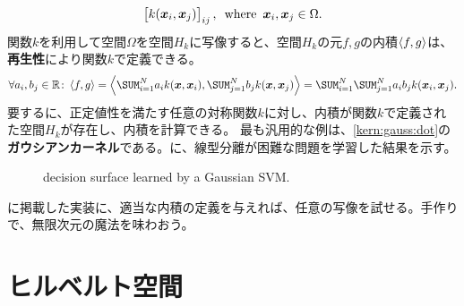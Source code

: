 \documentclass[10pt,a4paper]{book}
\begin{document}
%
\begin{equation}
\label{eq:kern:gram}
\begin{bmatrix}
k(\bm{x}_i,\bm{x}_j)
\end{bmatrix}_{ij},
\enspace\mathrm{where}\enspace
\bm{x}_i,\bm{x}_j \in \Omega.
\end{equation}
%
関数$k$を利用して空間$\Omega$を空間$H_k$に写像すると、空間$H_k$の元$f,g$の内積$\left\langle f,g\right\rangle$は、\textbf{再生性}により関数$k$で定義できる。
%
\begin{equation}
\forall a_i,b_j \in \mathbb{R} \colon
\iprod{f}{g} =
\iprod{\sum_{i=1}^N a_i k(\bm{x},\bm{x}_i)}{\sum_{j=1}^N b_j k(\bm{x},\bm{x}_j)} =
\sum_{i=1}^N \sum_{j=1}^N a_i b_j k(\bm{x}_i, \bm{x}_j).
\end{equation}
%
要するに、正定値性を満たす任意の対称関数$k$に対し、内積が関数$k$で定義された空間$H_k$が存在し、内積を計算できる。
最も汎用的な例は、\eqref{kern:gauss:dot}の\textbf{ガウシアンカーネル}である。に、線型分離が困難な問題を学習した結果を示す。

\begin{figure}[h]
\centering
{}
\caption{decision surface learned by a Gaussian SVM.\label{fig:svm:kern}}
\end{figure}

に掲載した実装に、適当な内積の定義を与えれば、任意の写像を試せる。手作りで、無限次元の魔法を味わおう。

\section{ヒルベルト空間}
\end{document}
